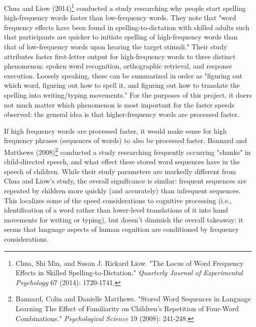 \documentclass[11pt]{article}
\begin{document}
Chua and Liow (2014)\footnote{Chua, Shi Min, and Susan J. Rickard Liow. "The Locus of Word Frequency Effects in Skilled Spelling-to-Dictation." \emph{Quarterly Journal of Experimental Psychology} 67 (2014): 1720-1741.} conducted a study researching why people start spelling high-frequency words faster than low-frequency words. They note that "word frequency effects have been found in spelling-to-dictation with skilled adults such that participants are quicker to initiate spelling of high-frequency words than that of low-frequency words upon hearing the target stimuli." Their study attributes faster first-letter output for high-frequency words to three distinct phenomenon: spoken word recognition, orthographic retrieval, and response execution. Loosely speaking, these can be summarized in order as "figuring out which word, figuring out how to spell it, and figuring out how to translate the spelling into writing/typing movements." For the purposes of this project, it doers not much matter which phenomenon is most important for the faster speeds observed: the general idea is that higher-frequency words are processed faster.

If high frequency words are processed faster, it would make sense for high frequency phrases (sequences of words) to also be processed faster. Bannard and Matthews (2008)\footnote{Bannard, Colin and Danielle Matthews. "Stored Word Sequences in Language Learning The Effect of Familiarity on Children's Repetition of Four-Word Combinations." \emph{Psychological Science} 19 (2008): 241-248.} conducted a study researching frequently occurring "chunks" in child-directed speech, and what effect these stored word sequences have in the speech of children. While their study parameters are markedly different from Chua and Liow's study, the overall significance is similar: frequent sequences are repeated by children more quickly (and accurately) than infrequent sequences. This localizes some of the speed considerations to cognitive processing (i.e., identification of a word rather than lower-level translations of it into hand movements for writing or typing), but doesn't diminish the overall takeaway: it seems that language aspects of human cognition are conditioned by frequency considerations.
\end{document}
